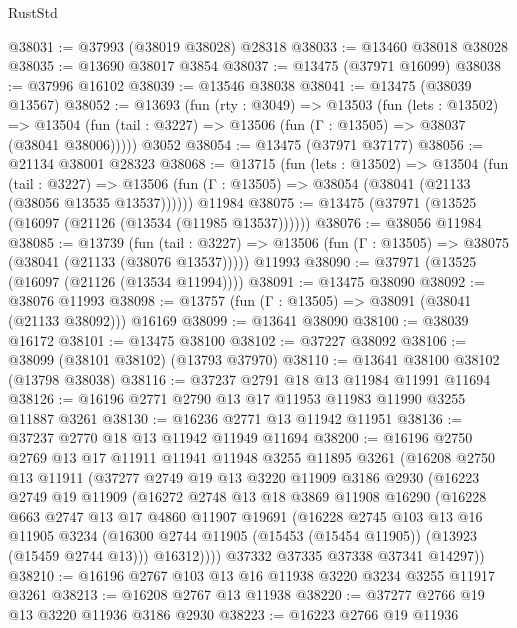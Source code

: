 \begin{lexlean}{RustStd}
\begin{coremodule}
@38031 := @37993 (@38019 @38028) @28318
@38033 := @13460 @38018 @38028
@38035 := @13690 @38017 @3854
@38037 := @13475 (@37971 @16099)
@38038 := @37996 @16102
@38039 := @13546 @38038
@38041 := @13475 (@38039 @13567)
@38052 := @13693
    (fun (rty : @3049) =>
    @13503
      (fun (lets : @13502) =>
      @13504 (fun (tail : @3227) => @13506 (fun (Γ : @13505) => @38037 (@38041 @38006)))))
    @3052
@38054 := @13475 (@37971 @37177)
@38056 := @21134 @38001 @28323
@38068 := @13715
    (fun (lets : @13502) =>
    @13504
      (fun (tail : @3227) =>
      @13506 (fun (Γ : @13505) => @38054 (@38041 (@21133 (@38056 @13535 @13537))))))
    @11984
@38075 := @13475 (@37971 (@13525 (@16097 (@21126 (@13534 (@11985 @13537))))))
@38076 := @38056 @11984
@38085 := @13739
    (fun (tail : @3227) => @13506 (fun (Γ : @13505) => @38075 (@38041 (@21133 (@38076 @13537)))))
    @11993
@38090 := @37971 (@13525 (@16097 (@21126 (@13534 @11994))))
@38091 := @13475 @38090
@38092 := @38076 @11993
@38098 := @13757 (fun (Γ : @13505) => @38091 (@38041 (@21133 @38092))) @16169
@38099 := @13641 @38090
@38100 := @38039 @16172
@38101 := @13475 @38100
@38102 := @37227 @38092
@38106 := @38099 (@38101 @38102) (@13793 @37970)
@38110 := @13641 @38100 @38102 (@13798 @38038)
@38116 := @37237 @2791 @18 @13 @11984 @11991 @11694
@38126 := @16196 @2771 @2790 @13 @17 @11953 @11983 @11990 @3255 @11887 @3261
@38130 := @16236 @2771 @13 @11942 @11951
@38136 := @37237 @2770 @18 @13 @11942 @11949 @11694
@38200 := @16196
    @2750
    @2769
    @13
    @17
    @11911
    @11941
    @11948
    @3255
    @11895
    @3261
    (@16208
      @2750
      @13
      @11911
      (@37277
        @2749
        @19
        @13
        @3220
        @11909
        @3186
        @2930
        (@16223
          @2749
          @19
          @11909
          (@16272
            @2748
            @13
            @18
            @3869
            @11908
            @16290
            (@16228
              @663
              @2747
              @13
              @17
              @4860
              @11907
              @19691
              (@16228
                @2745
                @103
                @13
                @16
                @11905
                @3234
                (@16300 @2744 @11905 (@15453 (@15454 @11905)) (@13923 (@15459 @2744 @13)))
                @16312))))
        @37332
        @37335
        @37338
        @37341
        @14297))
@38210 := @16196 @2767 @103 @13 @16 @11938 @3220 @3234 @3255 @11917 @3261
@38213 := @16208 @2767 @13 @11938
@38220 := @37277 @2766 @19 @13 @3220 @11936 @3186 @2930
@38223 := @16223 @2766 @19 @11936

\end{coremodule}
\end{lexlean}
